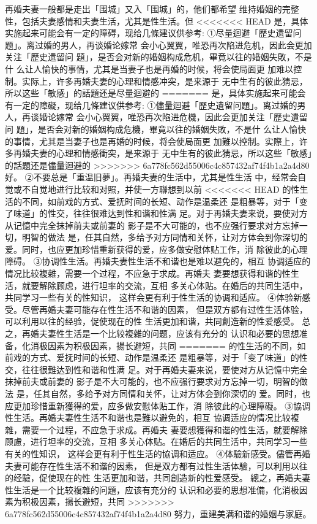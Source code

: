 \documentclass[12pt,UTF8]{ctexbook}
\begin{document}
再婚夫妻一般都是走出「围城」又入「围城」的，他们都希望
维持婚姻的完整性，包括夫妻感情和夫妻生活，尤其是性生活。但
<<<<<<< HEAD
是，具体实施起来可能会有一定的障碍，现给几條建议供参考:
①尽量迴避「歷史遗留问题」。离过婚的男人，再谈婚论嫁常
会小心翼翼，唯恐再次陷进危机，因此会更加关注「歷史遗留问
題」，是否会对新的婚姻构成危机，畢竟以往的婚姻失敗，不是什
么让人愉快的事情，尤其是当妻子也是再婚的时候，将会使局面更
加难以控制。实际上，许多再婚夫妻的心理和情感冲突，是来源于
无中生有的彼此猜忌，所以这些「敏感」的話題还是尽量迴避的
=======
是，具体实施起来可能会有一定的障礙，现给几條建议供参考:
①儘量迴避「歷史遺留问題」。离过婚的男人，再谈婚论嫁常
会小心翼翼，唯恐再次陷进危機，因此会更加关注「歷史遺留问
題」，是否会对新的婚姻构成危機，畢竟以往的婚姻失敗，不是什
么让人愉快的事情，尤其是当妻子也是再婚的时候，将会使局面更
加難以控制。实際上，许多再婚夫妻的心理和情感衝突，是来源于
无中生有的彼此猜忌，所以这些「敏感」的話題还是儘量迴避的
>>>>>>> 6a778fc562d55006c4c857432af74f4b1a2a4d80
好。
②不要总是「重温旧夢」。再婚夫妻的生活中，尤其是性生活
中，经常会自觉或不自觉地进行比较和对照，并使一方聯想到以前
<<<<<<< HEAD
的性生活的不同，如前戏的方式、爱抚时间的长短、动作是温柔还
是粗暴等，对于「变了味道」的性交，往往很难达到性和谐和性满
足。对于再婚夫妻来说，要使对方从记憶中完全抹掉前夫或前妻的
影子是不大可能的，也不应强行要求对方忘掉一切，明智的做法
是，任其自然，多给予对方同情和关怀，让对方体会到你深切的
爱。同时，也应更加珍惜重新获得的爱，应多做安慰体贴工作，消
除彼此的心理障碍。
③协调性生活。再婚夫妻性生活不和谐也是难以避免的，相互
协调适应的情况比较複雜，需要一个过程，不应急于求成。再婚夫
妻要想获得和谐的性生活，就要解除顾虑，进行坦率的交流，互相
多关心体贴。在婚后的共同生活中，共同学习一些有关的性知识，
这样会更有利于性生活的协调和适应。
④体验新感受。尽管再婚夫妻可能存在性生活不和谐的因素，
但是双方都有过性生活体验，可以利用以往的经验，促使现在的性
生活更加和谐，共同創造新的性爱感受。
总之，再婚夫妻性生活是一个比较複雜的问题，应该有充分的
认识和必要的思想准备，化消极因素为积极因素，揚长避短，共同
=======
的性生活的不同，如前戏的方式、爱抚时间的长短、动作是温柔还
是粗暴等，对于「变了味道」的性交，往往很難达到性和谐和性满
足。对于再婚夫妻来说，要使对方从记憶中完全抹掉前夫或前妻的
影子是不大可能的，也不应强行要求对方忘掉一切，明智的做法
是，任其自然，多给予对方同情和关怀，让对方体会到你深切的
爱。同时，也应更加珍惜重新獲得的爱，应多做安慰体贴工作，消
除彼此的心理障礙。
③協调性生活。再婚夫妻性生活不和谐也是難以避免的，相互
協调适应的情况比较複雜，需要一个过程，不应急于求成。再婚夫
妻要想獲得和谐的性生活，就要解除顾慮，进行坦率的交流，互相
多关心体贴。在婚后的共同生活中，共同学习一些有关的性知识，
这样会更有利于性生活的協调和适应。
④体驗新感受。儘管再婚夫妻可能存在性生活不和谐的因素，
但是双方都有过性生活体驗，可以利用以往的经驗，促使现在的性
生活更加和谐，共同創造新的性爱感受。
總之，再婚夫妻性生活是一个比较複雜的问題，应该有充分的
认识和必要的思想准備，化消极因素为积极因素，揚长避短，共同
>>>>>>> 6a778fc562d55006c4c857432af74f4b1a2a4d80
努力，重建美满和谐的婚姻与家庭。
\end{document}
